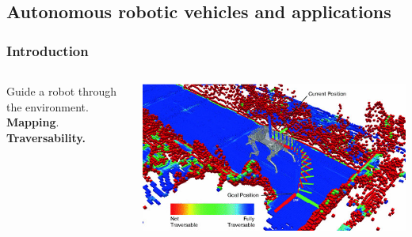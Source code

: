 \documentclass[usenames,dvipsnames,10pt]{beamer}
\begin{document}
\subsection{Autonomous robotic vehicles and applications}
\begin{frame}
\frametitle{Introduction}
\begin{columns}
	\begin{column}{0.55\textwidth}
		\hspace{0.5cm} Guide a robot through the environment. \\[0.1cm]
		\hspace{1.2cm} \textbf{Mapping}. \\
		\hspace{1.2cm} \textbf{Traversability.} \\
		\hspace{1.2cm} \phantom{Localization.} \\
		\hspace{1.2cm} \phantom{Localization.} \\
	\end{column}
	\begin{column}{0.5\textwidth}
		\begin{center}
			\includegraphics[width=\textwidth]{graphics/traversability.png} \\
			\tiny{}
		\end{center}
	\end{column}
\end{columns}
\end{frame}
\end{document}
